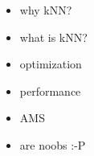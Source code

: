\begin{itemize}
	\item why kNN?
	\item what is kNN?
	\item optimization
	\item performance
	\item AMS
	\item \cite{californiaPaper} are noobs :-P
\end{itemize}